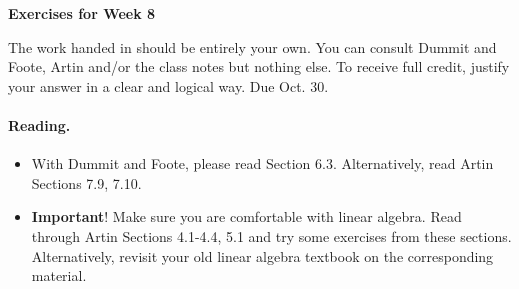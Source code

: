 \documentclass[12pt]{article}
\title{}
\date{}
\theoremstyle{plain}
\theoremstyle{definition}
\theoremstyle{remark}
\begin{document}
\begin{center}
{\Large \bf Exercises for Week 8}
\end{center}
The work handed in should be entirely your own. You can consult Dummit and Foote, Artin and/or the class notes but nothing else. To receive full credit, justify your answer in a clear and logical way. Due Oct. 30.

\paragraph{Reading.}
\begin{itemize}
\item With Dummit and Foote, please read Section 6.3.  Alternatively, read Artin Sections 7.9, 7.10.
\item {\bf Important}! Make sure you are comfortable with linear algebra. Read through Artin Sections 4.1-4.4, 5.1 and try some exercises from these sections. Alternatively, revisit your old linear algebra textbook on the corresponding material.
\end{itemize}
\end{document}
